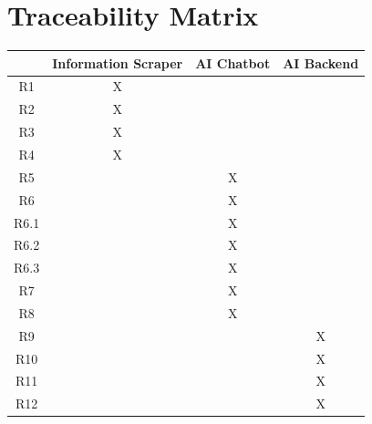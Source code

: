 \documentclass[11pt]{article}
\begin{document}
\section{Traceability Matrix}
\begin{center}
 \begin{tabular}{||c | c | c | c ||} 
 \hline
  & Information Scraper & AI Chatbot & AI Backend \\
 \hline\hline
 R1 & X &  &  \\
 \hline
 R2 & X &  &  \\
 \hline
 R3 & X &  &  \\
 \hline
 R4 & X &  &  \\
 \hline
 R5 &  & X &  \\
 \hline
 R6 &  & X &  \\
 \hline
 R6.1 &  & X &  \\
 \hline
 R6.2 &  & X &  \\
 \hline
 R6.3 &  & X &  \\
 \hline
 R7 &  & X &  \\
 \hline
 R8 &  & X &  \\
 \hline
 R9 &  &  & X \\
 \hline
 R10 &  &  & X \\
 \hline
 R11 &  &  & X \\
 \hline
 R12 &  &  & X \\
 \hline

\end{tabular}
\end{center}
\end{document}
